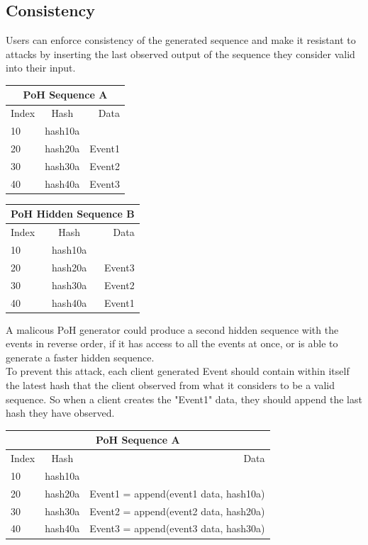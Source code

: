 \documentclass[12pt]{article}
\begin{document}
\subsection{Consistency}
Users can enforce consistency of the generated sequence and make it resistant to attacks by inserting the last observed output of the sequence they consider valid into their input.\\

\begin{center}
  \begin{tabular}{ | l | c | r |}
    \hline
    \multicolumn{3}{|c|}{PoH Sequence A} \\
    \hline
    Index & Hash & Data \\ \hline
    10 & hash10a & \\ \hline
    20 & hash20a & Event1 \\ \hline
    30 & hash30a & Event2 \\ \hline
    40 & hash40a & Event3 \\
    \hline
    \end{tabular}
  \begin{tabular}{ | l | c | r |}
    \hline
    \multicolumn{3}{|c|}{PoH Hidden Sequence B} \\
    \hline
    Index & Hash & Data \\ \hline
    10 & hash10a & \\ \hline
    20 & hash20a & Event3 \\ \hline
    30 & hash30a & Event2 \\ \hline
    40 & hash40a & Event1 \\
    \hline
    \end{tabular}
\end{center}

A malicous PoH generator could produce a second hidden sequence with the events in reverse order, if it has access to all the events at once, or is able to generate a faster hidden sequence.\\

To prevent this attack, each client generated Event should contain within itself the latest hash that the client observed from what it considers to be a valid sequence. So when a client creates the "Event1" data, they should append the last hash they have observed.\\

\begin{center}
  \begin{tabular}{ | l | c | r |}
    \hline
    \multicolumn{3}{|c|}{PoH Sequence A} \\
    \hline
    Index & Hash & Data \\ \hline
    10 & hash10a & \\ \hline
    20 & hash20a & Event1 = append(event1 data, hash10a) \\ \hline
    30 & hash30a & Event2 = append(event2 data, hash20a) \\ \hline
    40 & hash40a & Event3 = append(event3 data, hash30a) \\
    \hline
    \end{tabular}
\end{center}
\end{document}
